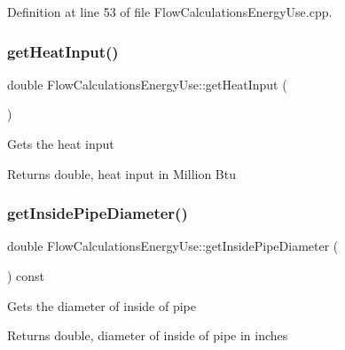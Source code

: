 Definition at line 53 of file Flow\+Calculations\+Energy\+Use.\+cpp.

\mbox{\label{class_flow_calculations_energy_use_af2d2196911d4784d72b14dff83295b19}} 
\subsubsection{\texorpdfstring{get\+Heat\+Input()}{getHeatInput()}\hspace{0.1cm}{\footnotesize\ttfamily [3/3]}}
{\footnotesize\ttfamily double Flow\+Calculations\+Energy\+Use\+::get\+Heat\+Input (\begin{DoxyParamCaption}{ }\end{DoxyParamCaption})}

Gets the heat input

\begin{DoxyReturn}{Returns}
double, heat input in Million Btu 
\end{DoxyReturn}
\mbox{\label{class_flow_calculations_energy_use_a9042dce2938208358fe38ed8a726ca65}} 
\subsubsection{\texorpdfstring{get\+Inside\+Pipe\+Diameter()}{getInsidePipeDiameter()}\hspace{0.1cm}{\footnotesize\ttfamily [1/3]}}
{\footnotesize\ttfamily double Flow\+Calculations\+Energy\+Use\+::get\+Inside\+Pipe\+Diameter (\begin{DoxyParamCaption}{ }\end{DoxyParamCaption}) const\hspace{0.3cm}{\ttfamily [inline]}}

Gets the diameter of inside of pipe

\begin{DoxyReturn}{Returns}
double, diameter of inside of pipe in inches 
\end{DoxyReturn}


